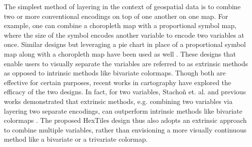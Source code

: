 The simplest method of layering in the context of geospatial data is to combine two or more conventional encodings on top of one another on one map.
%
For example, one can combine a choropleth map with a proportional symbol map, where the size of the symbol encodes another variable to encode two variables at once. 
%
Similar designs but leveraging a pie chart in place of a proportional symbol map along with a choropleth map have been used as well \cite{Tyner_2014, vallandingham}.
These designs that enable users to visually separate the variables are referred to as extrinsic methods as opposed to intrinsic methods like bivariate colormaps.
%
Though both are effective for certain purposes, recent works in cartography have explored the efficacy of the two designs.
%
In fact, for two variables, Stachoň et. al. and previous works demonstrated that extrinsic methods, e.g. combining two variables via layering two separate encodings, can outperform intrinsic methods like bivariate colormaps \cite{stachon_comparison_2023, sasinka_comparison_2021}.
%
The proposed HexTiles design thus also adopts an extrinsic approach to combine multiple variables, rather than envisioning a more visually continuous method like a bivariate or a trivariate colormap.

